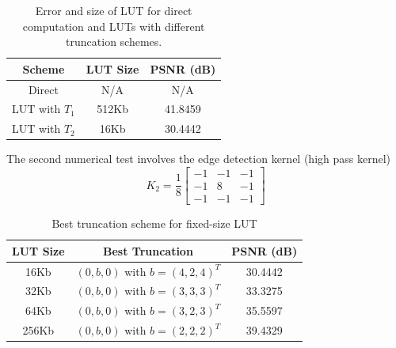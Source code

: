 \documentclass[12pt]{amsart}
\theoremstyle{definition}
\theoremstyle{remark}
\numberwithin{thm}{section}
\begin{document}
\begin{center}
\begin{table}
	 
    \begin{tabular}{ | c | c| c |}
    \hline
    Scheme & LUT Size & PSNR (dB) \\ \hline
    Direct & N/A & N/A  \\ \hline
    LUT with $T_1$ & 512Kb & 41.8459 \\ \hline
    LUT with $T_2$ & 16Kb & 30.4442 \\ \hline   
    \end{tabular}
    \bigskip
    
    \caption{Error and size of LUT for direct computation and LUTs with different truncation schemes.}
\end{table} 
\end{center}



The second numerical test involves the edge detection kernel (high pass kernel)
$$
K_2=\frac{1}{8}
\begin{bmatrix}
-1 & -1 & -1\\
-1 &  8 & -1\\
-1 & -1 & -1
\end{bmatrix}
$$

\begin{center}
\begin{table}
	
    \begin{tabular}{ | c | c | c | }
    \hline
    LUT Size & Best Truncation & PSNR (dB) \\ \hline
    16Kb& $(0,b,0)$ with $b=(4,2,4)^T$ & 30.4442 \\ \hline
    32Kb& $(0,b,0)$ with $b=(3,3,3)^T$ & 33.3275 \\ \hline 
    64Kb& $(0,b,0)$ with $b=(3,2,3)^T$ & 35.5597 \\ \hline 
    256Kb& $(0,b,0)$ with $b=(2,2,2)^T$ & 39.4329 \\ \hline 
    \end{tabular}
    \bigskip
    
    \caption{Best truncation scheme for fixed-size LUT}
\end{table} 
\end{center}
\end{document}
